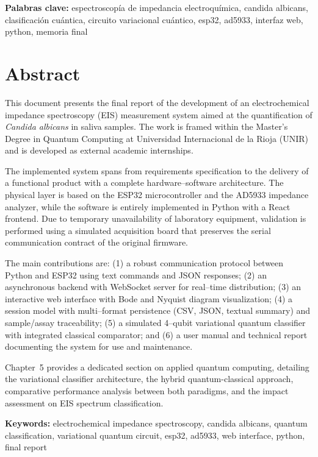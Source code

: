 \documentclass[11pt,a4paper,spanish]{book}
\begin{document}
\vspace{0.5cm}
{\bf Palabras clave:} espectroscop\'{i}a de impedancia electroqu\'{i}mica, candida albicans, clasificaci\'{o}n cu\'{a}ntica, circuito variacional cu\'{a}ntico, esp32, ad5933, interfaz web, python, memoria final

\chapter{Abstract}

This document presents the final report of the development of an electrochemical impedance spectroscopy (EIS) measurement system aimed at the quantification of \textit{Candida albicans} in saliva samples. The work is framed within the Master's Degree in Quantum Computing at Universidad Internacional de la Rioja (UNIR) and is developed as external academic internships.

The implemented system spans from requirements specification to the delivery of a functional product with a complete hardware--software architecture. The physical layer is based on the ESP32 microcontroller and the AD5933 impedance analyzer, while the software is entirely implemented in Python with a React frontend. Due to temporary unavailability of laboratory equipment, validation is performed using a simulated acquisition board that preserves the serial communication contract of the original firmware.

The main contributions are: (1) a robust communication protocol between Python and ESP32 using text commands and JSON responses; (2) an asynchronous backend with WebSocket server for real--time distribution; (3) an interactive web interface with Bode and Nyquist diagram visualization; (4) a session model with multi--format persistence (CSV, JSON, textual summary) and sample/assay traceability; (5) a simulated 4--qubit variational quantum classifier with integrated classical comparator; and (6) a user manual and technical report documenting the system for use and maintenance.

Chapter~5 provides a dedicated section on applied quantum computing, detailing the variational classifier architecture, the hybrid quantum-classical approach, comparative performance analysis between both paradigms, and the impact assessment on EIS spectrum classification.

\vspace{0.5cm}
{\bf Keywords:} electrochemical impedance spectroscopy, candida albicans, quantum classification, variational quantum circuit, esp32, ad5933, web interface, python, final report
\end{document}
